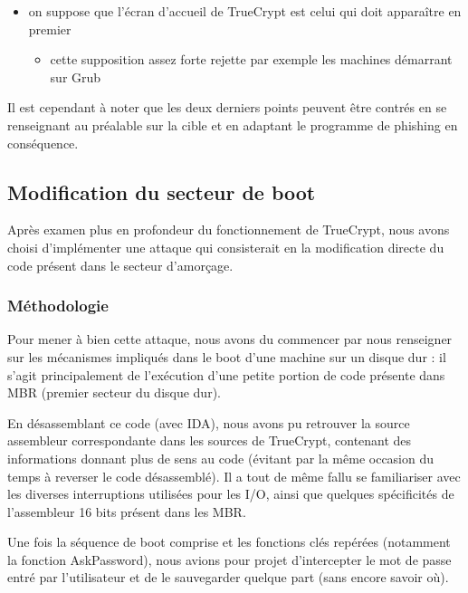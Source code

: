 \documentclass[12pt,a4paper]{article}
\begin{document}
{\begin{itemize}
\begin{itemize}
	\end{itemize}
	\item on suppose que l'écran d’accueil de TrueCrypt est celui qui doit apparaître en premier
	\begin{itemize}
		\item cette supposition assez forte rejette par exemple les machines démarrant sur Grub
	\end{itemize}
\end{itemize}
}

Il est cependant à noter que les deux derniers points peuvent être contrés en
se renseignant au préalable sur la cible et en adaptant le programme de
phishing en conséquence.


\subsection{Modification du secteur de boot}

Après examen plus en profondeur du fonctionnement de TrueCrypt, nous avons
choisi d'implémenter une attaque qui consisterait en la modification directe du
code présent dans le secteur d'amorçage.

\subsubsection{Méthodologie}

Pour mener à bien cette attaque, nous avons du commencer par nous renseigner
sur les mécanismes impliqués dans le boot d'une machine sur un disque dur : il
s'agit principalement de l'exécution d'une petite portion de code présente dans
MBR (premier secteur du disque dur).

En désassemblant ce code (avec IDA), nous avons pu retrouver la source
assembleur correspondante dans les sources de TrueCrypt, contenant des
informations donnant plus de sens au code (évitant par la même occasion du
temps à reverser le code désassemblé). Il a tout de même fallu se familiariser
avec les diverses interruptions utilisées pour les I/O, ainsi que quelques
spécificités de l'assembleur 16 bits présent dans les MBR.

Une fois la séquence de boot comprise et les fonctions clés repérées (notamment
la fonction AskPassword), nous avions pour projet d'intercepter le mot de passe
entré par l'utilisateur et de le sauvegarder quelque part (sans encore savoir
où).
\end{document}

